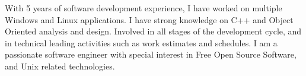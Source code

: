 

\begin{cvparagraph}

With 5 years of software development experience, I have worked on multiple Windows and Linux applications. I have strong knowledge on C++ and Object Oriented analysis and design. Involved in all stages of the development cycle, and in technical leading activities such as work estimates and schedules. I am a passionate software engineer with special interest in Free Open Source Software, and Unix related technologies.

\end{cvparagraph}
